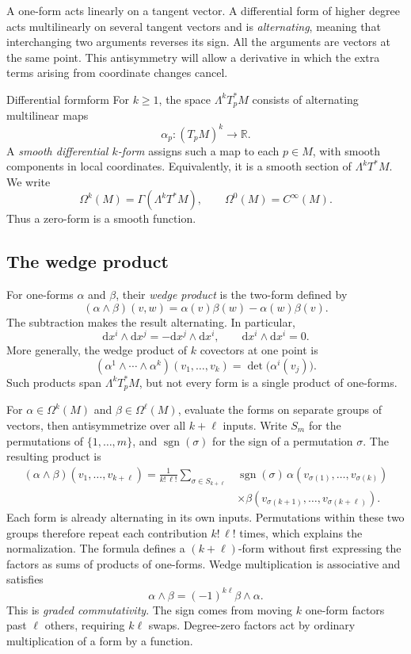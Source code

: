 \documentclass[11pt,a4paper]{article}
\numberwithin{equation}{section}
\newcommand{\R}{\mathbb R}
\newcommand{\dd}{\mathrm d}
\newcommand{\Cinf}{C^\infty}
\begin{document}
A one-form acts linearly on a tangent vector. A differential form of
higher degree acts multilinearly on several tangent vectors and is
\emph{alternating}, meaning that interchanging two arguments reverses
its sign. All the arguments are vectors at the same point.
This antisymmetry will allow a derivative in which the extra terms
arising from coordinate changes cancel.

\begin{definition}{Differential form}{form}
For \(k\geq1\), the space \(\Lambda^kT_p^*M\) consists of alternating
multilinear maps
\[
 \alpha_p:(T_pM)^k\longrightarrow\R.
\]
A \emph{smooth differential \(k\)-form} assigns such a map to each
\(p\in M\), with smooth components in local coordinates. Equivalently,
it is a smooth section of \(\Lambda^kT^*M\). We write
\[
 \Omega^k(M)=\Gamma(\Lambda^kT^*M),\qquad
 \Omega^0(M)=\Cinf(M).
\]
Thus a zero-form is a smooth function.
\end{definition}

\subsection{The wedge product}

For one-forms \(\alpha\) and \(\beta\), their \emph{wedge product} is
the two-form defined by
\[
 (\alpha\wedge\beta)(v,w)
 =\alpha(v)\beta(w)-\alpha(w)\beta(v).
\]
The subtraction makes the result alternating. In particular,
\[
 \dd x^i\wedge\dd x^j=-\dd x^j\wedge\dd x^i,
 \qquad \dd x^i\wedge\dd x^i=0.
\]
More generally, the wedge product of \(k\) covectors at one point is
\[
 (\alpha^1\wedge\cdots\wedge\alpha^k)(v_1,\ldots,v_k)
 =\det\bigl(\alpha^i(v_j)\bigr).
\]
Such products span \(\Lambda^kT_p^*M\), but not every form is a single
product of one-forms.

For \(\alpha\in\Omega^k(M)\) and \(\beta\in\Omega^\ell(M)\),
evaluate the forms on separate groups of vectors, then antisymmetrize
over all \(k+\ell\) inputs. Write \(S_m\) for the permutations of
\(\{1,\ldots,m\}\), and \(\operatorname{sgn}(\sigma)\) for the sign
of a permutation \(\sigma\). The resulting product is
\[
 \begin{aligned}
 (\alpha\wedge\beta)(v_1,\ldots,v_{k+\ell})
 =\frac1{k!\,\ell!}\sum_{\sigma\in S_{k+\ell}}
 &\operatorname{sgn}(\sigma)\,
  \alpha(v_{\sigma(1)},\ldots,v_{\sigma(k)})\\
 &\times\beta(v_{\sigma(k+1)},\ldots,v_{\sigma(k+\ell)}).
 \end{aligned}
\]
Each form is already alternating in its own inputs. Permutations within
these two groups therefore repeat each contribution \(k!\,\ell!\)
times, which explains the normalization. The formula defines a
\((k+\ell)\)-form without first expressing the factors as sums of
products of one-forms. Wedge multiplication is associative and satisfies
\[
 \alpha\wedge\beta=(-1)^{k\ell}\beta\wedge\alpha.
\]
This is \emph{graded commutativity}. The sign comes from moving \(k\)
one-form factors past \(\ell\) others, requiring \(k\ell\) swaps.
Degree-zero factors act by ordinary multiplication of a form by a function.
\end{document}
